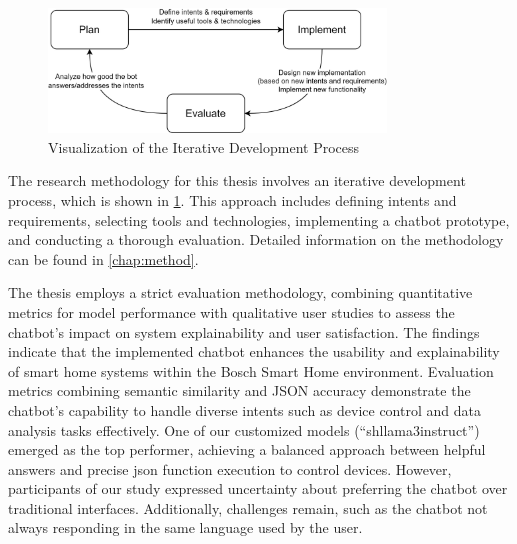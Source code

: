 \begin{figure}[b]
\centering
\includegraphics[width=0.8\textwidth]{graphics/iterative-design.png}
\caption{Visualization of the Iterative Development Process}
\label{fig:iterative-design}
\end{figure}
The research methodology for this thesis involves an iterative development process, which is shown in \cref{fig:iterative-design}. This approach includes defining intents and requirements, selecting tools and technologies, implementing a chatbot prototype, and conducting a thorough evaluation. Detailed information on the methodology can be found in \cref{chap:method}.

The thesis employs a strict evaluation methodology, combining quantitative metrics for model performance with qualitative user studies to assess the chatbot's impact on system explainability and user satisfaction.
The  findings indicate that the implemented chatbot enhances the usability and explainability of smart home systems within the Bosch Smart Home environment. Evaluation metrics combining semantic similarity and JSON accuracy demonstrate the chatbot's capability to handle diverse intents such as device control and data analysis tasks effectively. One of our customized models (``shllama3instruct'') emerged as the top performer, achieving a balanced approach between helpful answers and precise \gls{json} function execution to control devices.
However, participants of our study expressed uncertainty about preferring the chatbot over traditional interfaces. Additionally, challenges remain, such as the chatbot not always responding in the same language used by the user.

